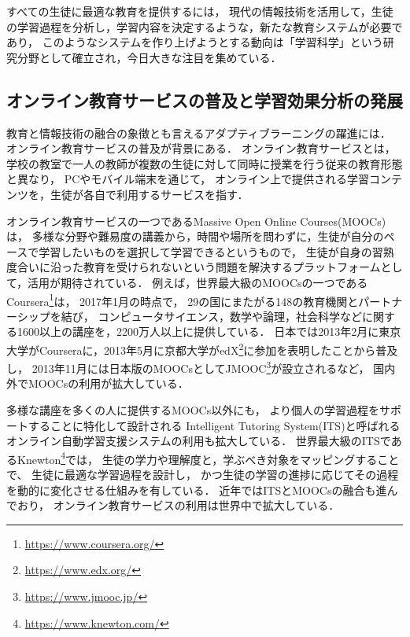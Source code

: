すべての生徒に最適な教育を提供するには，
現代の情報技術を活用して，生徒の学習過程を分析し，学習内容を決定するような，新たな教育システムが必要であり，
このようなシステムを作り上げようとする動向は「学習科学」という研究分野として確立され，今日大きな注目を集めている\cite{白水始2014学習科学の新展開}．


\subsection{オンライン教育サービスの普及と学習効果分析の発展}
教育と情報技術の融合の象徴とも言えるアダプティブラーニングの躍進には．
オンライン教育サービスの普及が背景にある．
オンライン教育サービスとは，
学校の教室で一人の教師が複数の生徒に対して同時に授業を行う従来の教育形態と異なり，
PCやモバイル端末を通じて，
オンライン上で提供される学習コンテンツを，生徒が各自で利用するサービスを指す．

オンライン教育サービスの一つであるMassive Open Online Courses(MOOCs)\cite{mcauley2010mooc, pappano2012year,siemens2013massive}は，
多様な分野や難易度の講義から，時間や場所を問わずに，生徒が自分のペースで学習したいものを選択して学習できるというもので，
生徒が自身の習熟度合いに沿った教育を受けられないという問題を解決するプラットフォームとして，活用が期待されている．
例えば，世界最大級のMOOCsの一つであるCoursera\footnote{\url{https://www.coursera.org/}}は，
2017年1月の時点で，
29の国にまたがる148の教育機関とパートナーシップを結び，
コンピュータサイエンス，数学や論理，社会科学などに関する1600以上の講座を，2200万人以上に提供している．
日本では2013年2月に東京大学がCourseraに，2013年5月に京都大学がedX\footnote{\url{https://www.edx.org/}}に参加を表明したことから普及し，
2013年11月には日本版のMOOCsとしてJMOOC\footnote{\url{https://www.jmooc.jp/}}が設立されるなど，
国内外でMOOCsの利用が拡大している．

多様な講座を多くの人に提供するMOOCs以外にも，
より個人の学習過程をサポートすることに特化して設計される
Intelligent Tutoring System(ITS)と呼ばれるオンライン自動学習支援システムの利用も拡大している．
世界最大級のITSであるKnewton\footnote{\url{https://www.knewton.com/}}では，
生徒の学力や理解度と，学ぶべき対象をマッピングすることで、
生徒に最適な学習過程を設計し，
かつ生徒の学習の進捗に応じてその過程を動的に変化させる仕組みを有している\cite{upbin2012knewton}．
近年ではITSとMOOCsの融合も進んでおり\cite{aleven2015beginning}，
オンライン教育サービスの利用は世界中で拡大している．



